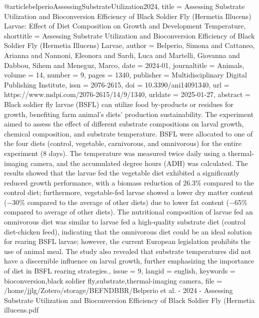 {{{@article{belperioAssessingSubstrateUtilization2024,
  title = {Assessing {{Substrate Utilization}} and {{Bioconversion Efficiency}} of {{Black Soldier Fly}} ({{Hermetia}} Illucens) {{Larvae}}: {{Effect}} of {{Diet Composition}} on {{Growth}} and {{Development Temperature}}},
  shorttitle = {Assessing {{Substrate Utilization}} and {{Bioconversion Efficiency}} of {{Black Soldier Fly}} ({{Hermetia}} Illucens) {{Larvae}}},
  author = {Belperio, Simona and Cattaneo, Arianna and Nannoni, Eleonora and Sardi, Luca and Martelli, Giovanna and Dabbou, Sihem and Meneguz, Marco},
  date = {2024-01},
  journaltitle = {Animals},
  volume = {14},
  number = {9},
  pages = {1340},
  publisher = {Multidisciplinary Digital Publishing Institute},
  issn = {2076-2615},
  doi = {10.3390/ani14091340},
  url = {https://www.mdpi.com/2076-2615/14/9/1340},
  urldate = {2025-01-27},
  abstract = {Black soldier fly larvae (BSFL) can utilize food by-products or residues for growth, benefiting farm animal’s diets’ production sustainability. The experiment aimed to assess the effect of different substrate compositions on larval growth, chemical composition, and substrate temperature. BSFL were allocated to one of the four diets (control, vegetable, carnivorous, and omnivorous) for the entire experiment (8 days). The temperature was measured twice daily using a thermal-imaging camera, and the accumulated degree hours (ADH) was calculated. The results showed that the larvae fed the vegetable diet exhibited a significantly reduced growth performance, with a biomass reduction of 26.3\% compared to the control diet; furthermore, vegetable-fed larvae showed a lower dry matter content (−30\% compared to the average of other diets) due to lower fat content (−65\% compared to average of other diets). The nutritional composition of larvae fed an omnivorous diet was similar to larvae fed a high-quality substrate diet (control diet-chicken feed), indicating that the omnivorous diet could be an ideal solution for rearing BSFL larvae; however, the current European legislation prohibits the use of animal meal. The study also revealed that substrate temperatures did not have a discernible influence on larval growth, further emphasizing the importance of diet in BSFL rearing strategies.},
  issue = {9},
  langid = {english},
  keywords = {bioconversion,black soldier fly,substrate,thermal-imaging camera},
  file = {/home/jjlg/Zotero/storage/BEFNDBBR/Belperio et al. - 2024 - Assessing Substrate Utilization and Bioconversion Efficiency of Black Soldier Fly (Hermetia illucens.pdf}
}

}}}
